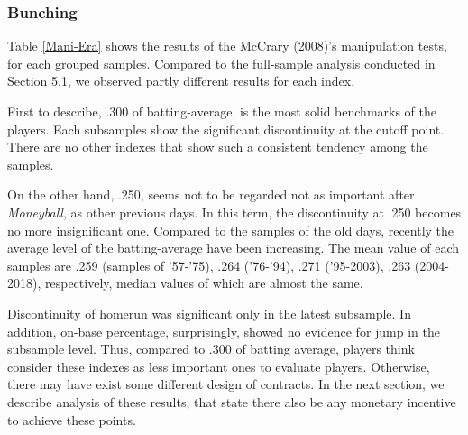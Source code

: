 \documentclass[dvipdfmx, 12pt]{article}
\begin{document}
\subsubsection{Bunching}

Table \ref{Mani-Era} shows the results of the McCrary (2008)'s manipulation tests, for each grouped samples. Compared to the full-sample analysis conducted in Section 5.1, we observed partly different results for each index.

First to describe, .300 of batting-average, is the most solid benchmarks of the players. Each subsamples show the significant discontinuity at the cutoff point. There are no other indexes that show such a consistent tendency among the samples.


On the other hand, .250, seems not to be regarded not as important  after \textit{Moneyball}, as other previous days. In this term, the discontinuity at .250 becomes no more insignificant one. Compared to the samples of the old days, recently the average level of the batting-average have been increasing. The mean value of each samples are .259 (samples of '57-'75), .264 ('76-'94), .271 ('95-2003), .263 (2004-2018), respectively, median values of which are almost the same.

Discontinuity of homerun was significant only in the latest subsample. In addition, on-base percentage, surprisingly, showed no evidence for jump in the subsample level. Thus, compared to .300 of batting average, players think consider these indexes as less important ones to evaluate players. Otherwise, there may have exist some different design of contracts. In the next section, we describe analysis of these results, that state there also be any monetary incentive to achieve these points.
\end{document}
